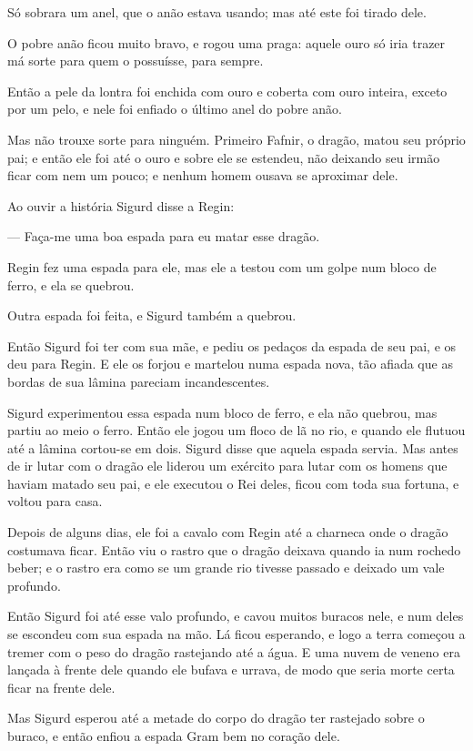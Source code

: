 Só sobrara um anel, que o anão estava usando; mas até este foi tirado
dele. 

O pobre anão ficou muito bravo, e rogou uma praga: aquele ouro só iria
trazer má sorte para quem o possuísse, para sempre. 

Então a pele da lontra foi enchida com ouro e coberta com ouro
inteira, exceto por um pelo, e nele foi enfiado o último anel do
pobre anão. 

Mas não trouxe sorte para ninguém. Primeiro Fafnir, o dragão, matou
seu próprio pai; e então ele foi até o ouro e sobre ele se estendeu,
não deixando seu irmão ficar com nem um pouco; e nenhum homem ousava
se aproximar dele. 

Ao ouvir a história Sigurd disse a Regin:

— Faça-me uma boa espada para eu matar esse dragão. 

Regin fez uma espada para ele, mas ele a testou com um golpe num bloco
de ferro, e ela se quebrou. 

Outra espada foi feita, e Sigurd também a quebrou. 

Então Sigurd foi ter com sua mãe, e pediu os pedaços da espada de seu
pai, e os deu para Regin. E ele os forjou e martelou numa espada
nova, tão afiada que as bordas de sua lâmina pareciam incandescentes.

Sigurd experimentou essa espada num bloco de ferro, e ela não quebrou,
mas partiu ao meio o ferro. Então ele jogou um floco de lã no rio, e
quando ele flutuou até a lâmina cortou-se em dois. Sigurd disse que
aquela espada servia. Mas antes de ir lutar com o dragão ele liderou
um exército para lutar com os homens que haviam matado seu pai, e ele
executou o Rei deles, ficou com toda sua fortuna, e voltou para casa.


Depois de alguns dias, ele foi a cavalo com Regin até a charneca onde
o dragão costumava ficar. Então viu o rastro que o dragão deixava
quando ia num rochedo beber; e o rastro era como se um grande rio
tivesse passado e deixado um vale profundo. 

Então Sigurd foi até esse valo profundo, e cavou muitos buracos nele,
e num deles se escondeu com sua espada na mão. Lá ficou esperando, e
logo a terra começou a tremer com o peso do dragão rastejando até a
água. E uma nuvem de veneno era lançada à frente dele quando ele
bufava e urrava, de modo que seria morte certa ficar na frente dele. 

Mas Sigurd esperou até a metade do corpo do dragão ter rastejado sobre
o buraco, e então enfiou a espada Gram bem no coração dele. 

